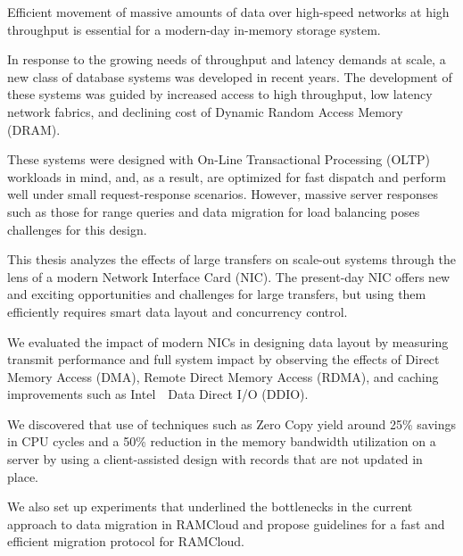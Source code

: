 


Efficient movement of massive amounts of data over high-speed networks at high 
throughput is essential for a modern-day in-memory storage system.

In response to the growing needs of throughput and latency demands at scale, a new class of database systems was developed in recent years.
The development of these \linebreak systems was guided by increased access to high throughput, low latency network fabrics, and declining cost of Dynamic Random Access Memory (DRAM).

These systems were designed with On-Line Transactional Processing (OLTP) \linebreak workloads in mind, and, as a result, are optimized for fast dispatch and perform well under small
request-response scenarios. However, massive server responses such as those for range queries and data migration for load balancing poses challenges for this design.  

This thesis analyzes the effects of large transfers on scale-out systems through the lens of a modern Network Interface Card (NIC).
The present-day NIC offers new and exciting opportunities and challenges for large transfers, but using them efficiently
 requires smart data layout and concurrency control.

We evaluated the impact of modern NICs in designing data layout by measuring \linebreak transmit 
performance and full system impact by observing the effects of Direct Memory Access (DMA), 
Remote Direct Memory Access (RDMA), and caching improvements such as Intel\textregistered~~Data Direct I/O (DDIO). 

We discovered that use of techniques such as Zero Copy yield around 25\% savings in CPU cycles and a 50\% reduction in the memory bandwidth utilization on a server
by using a client-assisted design with records that are not updated in place. 

We also set up experiments that underlined the bottlenecks in the current approach to data migration in RAMCloud and propose guidelines for a fast and efficient migration protocol for RAMCloud.
